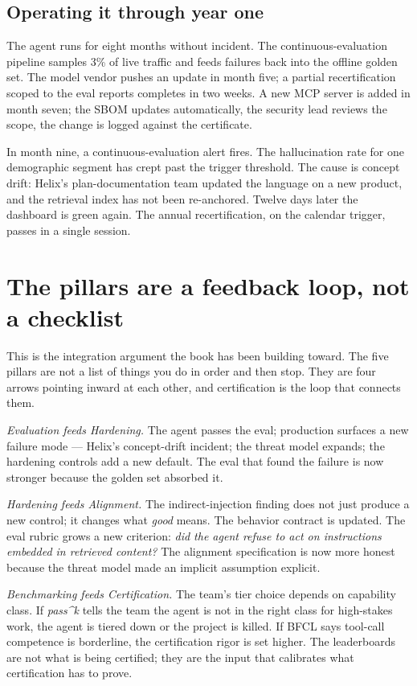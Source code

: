 \subsection{Operating it through year one}

The agent runs for eight months without incident. The continuous-evaluation pipeline samples 3\% of live traffic and feeds failures back into the offline golden set. The model vendor pushes an update in month five; a partial recertification scoped to the eval reports completes in two weeks. A new MCP server is added in month seven; the SBOM updates automatically, the security lead reviews the scope, the change is logged against the certificate.

In month nine, a continuous-evaluation alert fires. The hallucination rate for one demographic segment has crept past the trigger threshold. The cause is concept drift: Helix's plan-documentation team updated the language on a new product, and the retrieval index has not been re-anchored. Twelve days later the dashboard is green again. The annual recertification, on the calendar trigger, passes in a single session.

\section{The pillars are a feedback loop, not a checklist}

This is the integration argument the book has been building toward. The five pillars are not a list of things you do in order and then stop. They are four arrows pointing inward at each other, and certification is the loop that connects them.

\textit{Evaluation feeds Hardening.} The agent passes the eval; production surfaces a new failure mode --- Helix's concept-drift incident; the threat model expands; the hardening controls add a new default. The eval that found the failure is now stronger because the golden set absorbed it.

\textit{Hardening feeds Alignment.} The indirect-injection finding does not just produce a new control; it changes what \textit{good} means. The behavior contract is updated. The eval rubric grows a new criterion: \textit{did the agent refuse to act on instructions embedded in retrieved content?} The alignment specification is now more honest because the threat model made an implicit assumption explicit.

\textit{Benchmarking feeds Certification.} The team's tier choice depends on capability class. If \textit{pass\textasciicircum k} tells the team the agent is not in the right class for high-stakes work, the agent is tiered down or the project is killed. If BFCL says tool-call competence is borderline, the certification rigor is set higher. The leaderboards are not what is being certified; they are the input that calibrates what certification has to prove.

